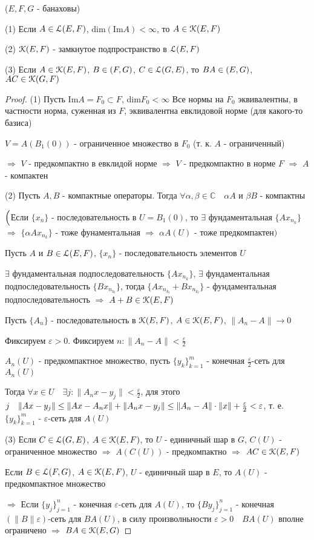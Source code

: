 \documentclass[a4paper,12pt]{report}
\newcommand*{\hm}[1]{#1\nobreak\discretionary{}%
            {\hbox{$\mathsurround=0pt #1$}}{}}
\begin{document}
\begin{thm}
($E,F,G$ - банаховы)

(1) Если $A\in\EuScript L(E,F)$, $\mathrm{dim}(\mathrm{Im}A)<\infty$, то $A\in\EuScript K(E,F)$

(2) $\EuScript K(E,F)$ - замкнутое подпространство в $\EuScript L(E,F)$

(3) Если $A\in\EuScript K(E,F)$, $B\in\EuScript(F,G)$, $C\in\EuScript L(G,E)$, то $BA\in\EuScript(E,G)$, $AC\hm\in\EuScript K(G,F)$
\end{thm}
\begin{proof}
(1) Пусть $\mathrm{Im}A=F_0\subset F$, $\mathrm{dim}F_0<\infty$
Все нормы на $F_0$ эквивалентны, в частности норма, суженная из $F$, эквивалентна евклидовой норме (для какого-то базиса)

$V=A(B_1(0))$ - ограниченное множество в $F_0$ (т. к. $A$ - ограниченный)

$\Rightarrow$ $V$ - предкомпактно в евклидой норме $\Rightarrow$ $V$ - предкомпактно в норме $F$ $\Rightarrow$ $A$ - компактен

(2) Пусть $A,B$ - компактные операторы. Тогда $\forall\alpha,\beta\in\mathbb C\quad \alpha A$ и $\beta B$ - компактны 

$\Bigl($Если $\{x_n\}$ - последовательность в $U=B_1(0)$, то $\exists$ фундаментальная $\{A x_{n_k}\}$ $\Rightarrow$ $\{\alpha A x_{n_k}\}$ - тоже фунаментальная $\Rightarrow$ $\alpha A(U)$ - тоже предкомпактен$\Bigr)$

Пусть $A$ и $B\in\EuScript L(E,F)$, $\{x_n\}$ - последовательность элементов $U$

$\exists$ фундаментальная подпоследовательность $\{A x_{n_k}\}$, $\exists$ фундаментальная подпоследовательность $\{B x_{n_{k_l}}\}$, тогда $\{Ax_{n_{k_l}}+Bx_{n_{k_l}}\}$ - фундаментальная подпоследовательность $\Rightarrow$ $A+B\in\EuScript K(E,F)$

Пусть $\{A_n\}$ - последовательность в $\EuScript K(E,F)$, $A\in\EuScript K(E,F)$, $\|A_n-A\|\to0$

Фиксируем $\varepsilon>0$. Фиксируем $n\colon\|A_n-A\|<\frac\varepsilon2$

$A_n(U)$ - предкомпактное множество, пусть $\{y_k\}_{k=1}^m$ - конечная $\frac\varepsilon2$-сеть для $A_n(U)$

Тогда $\forall x\in U\quad\exists j\colon\|A_n x-y_j\|<\frac\varepsilon2$, для этого $j\quad\|Ax-y_j\|\le\|Ax\hm-A_nx\|+\|A_nx-y_j\|\le\|A_n-A\|\cdot\|x\|+\frac\varepsilon2<\varepsilon$, т. е. $\{y_k\}_{k=1}^m$ - $\varepsilon$-сеть для $A(U)$

(3) Если $C\in\EuScript L(G,E)$, $A\in\EuScript K(E,F)$, то $U$ - единичный шар в $G$, $C(U)$ - ограниченное множество $\Rightarrow$ $A(C(U))$ - предкомпактно $\Rightarrow$ $AC\in\EuScript K(E,F)$

Если $B\in\EuScript L(F,G)$, $A\in\EuScript K(E,F)$, $U$ - единичный шар в $E$, то $A(U)$ - предкомпактное множество 

$\Rightarrow$ Если $\{y_j\}_{j=1}^n$ - конечная $\varepsilon$-сеть для $A(U)$, то $\{By_j\}_{j=1}^n$ - конечная $(\|B\|\varepsilon)$-сеть для $BA(U)$, в силу произволньности $\varepsilon>0\quad BA(U)$ вполне ограничено $\Rightarrow$ $BA\in\EuScript K(E,G)$
\end{proof}
\end{document}
